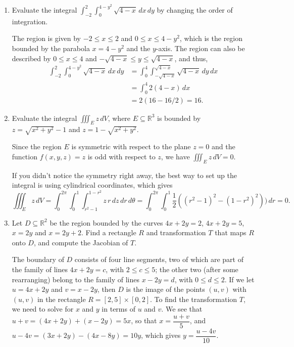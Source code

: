 \documentclass[12pt]{article}
\newcommand{\points}[1]{\marginpar{\hspace{24pt}[#1]}}
\newcommand{\di}{\displaystyle}
\begin{document}
\begin{enumerate}
\item Evaluate the integral $\di \int_{-2}^2\int_0^{4-y^2}\sqrt{4-x}\, dx\,dy$ by changing the order of integration. \points{6}

\bigskip

The region is given by $-2\leq x\leq 2$ and $0\leq x\leq 4-y^2$, which is the region bounded by the parabola $x=4-y^2$ and the $y$-axis. The region can also be described by $0\leq x\leq 4$ and $-\sqrt{4-x}\leq y\leq\sqrt{4-x}$, and thus,
\begin{align*}
 \int_{-2}^2\int_0^{4-y^2}\sqrt{4-x}\, dx\,dy & = \int_0^4\int_{-\sqrt{4-x}}^{\sqrt{4-x}}\sqrt{4-x}\,dy\,dx\\
& = \int_0^4 2(4-x)\,dx\\
& = 2(16-16/2) = 16.
\end{align*}


\bigskip


\item Evaluate the integral $\di \iiint_E z\,dV$, where $E\subseteq\mathbb{R}^3$ is bounded by $z=\sqrt{x^2+y^2}-1$ and $z=1-\sqrt{x^2+y^2}$. \points{5}

\bigskip

Since the region $E$ is symmetric with respect to the plane $z=0$ and the function $f(x,y,z)=z$ is odd with respect to $z$, we have $\di \iiint_E z\,dV=0$.

\medskip

If you didn't notice the symmetry right away, the best way to set up the integral is using cylindrical coordinates, which gives
\[
 \iiint_E z\,dV = \int_0^{2\pi}\int_0^1\int_{r^2-1}^{1-r^2}z\, r\,dz\,dr\,d\theta = \int_0^{2\pi}\int_0^1\frac{1}{2}((r^2-1)^2-(1-r^2)^2))\, dr = 0.
\]

\newpage



\item Let $D\subseteq \mathbb{R}^2$ be the region bounded by the curves $4x+2y=2$, $4x+2y=5$, $x=2y$ and $x=2y+2$. Find a rectangle $R$ and transformation $T$ that maps $R$ onto $D$, and compute the Jacobian of $T$.  \points{6}

\bigskip

The boundary of $D$ consists of four line segments, two of which are part of the family of lines $4x+2y=c$, with $2\leq c\leq 5$; the other two (after some rearranging) belong to the family of lines $x-2y=d$, with $0\leq d\leq 2$. If we let $u=4x+2y$ and $v=x-2y$, then $D$ is the image of the points $(u,v)$ with $(u,v)$ in the rectangle $R = [2,5]\times [0,2]$. To find the transformation $T$, we need to solve for $x$ and $y$ in terms of $u$ and $v$. We see that $u+v = (4x+2y)+(x-2y) = 5x$, so that $x = \dfrac{u+v}{5}$, and $u-4v = (3x+2y)-(4x-8y) = 10y$, which gives $y= \dfrac{u-4v}{10}$.


\end{enumerate}
\end{document}

